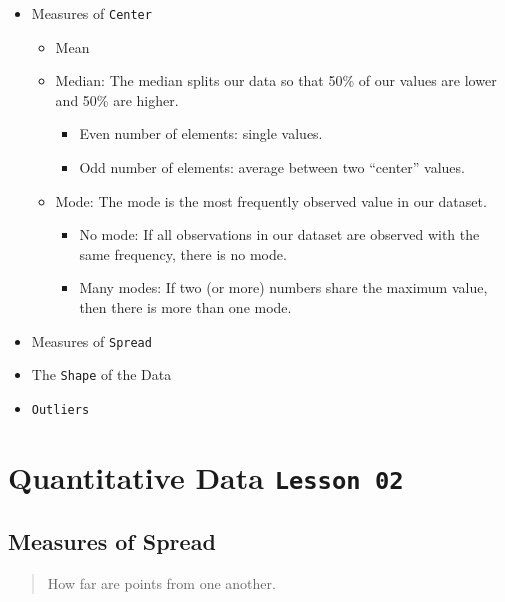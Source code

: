 \documentclass[]{book}
\providecommand{\tightlist}{%
  \setlength{\itemsep}{0pt}\setlength{\parskip}{0pt}}
\begin{document}
\begin{itemize}
\tightlist
\item
  Measures of \texttt{Center}

  \begin{itemize}
  \tightlist
  \item
    Mean
  \item
    Median: The median splits our data so that 50\% of our values are
    lower and 50\% are higher.

    \begin{itemize}
    \tightlist
    \item
      Even number of elements: single values.
    \item
      Odd number of elements: average between two ``center'' values.
    \end{itemize}
  \item
    Mode: The mode is the most frequently observed value in our dataset.

    \begin{itemize}
    \tightlist
    \item
      No mode: If all observations in our dataset are observed with the
      same frequency, there is no mode.
    \item
      Many modes: If two (or more) numbers share the maximum value, then
      there is more than one mode.
    \end{itemize}
  \end{itemize}
\item
  Measures of \texttt{Spread}
\item
  The \texttt{Shape} of the Data
\item
  \texttt{Outliers}
\end{itemize}

\section{\texorpdfstring{Quantitative Data
\texttt{Lesson\ 02}}{Quantitative Data Lesson 02}}\label{quantitative-data-lesson-02}

\subsection{Measures of Spread}\label{measures-of-spread}

\begin{quote}
How far are points from one another.
\end{quote}
\end{document}
